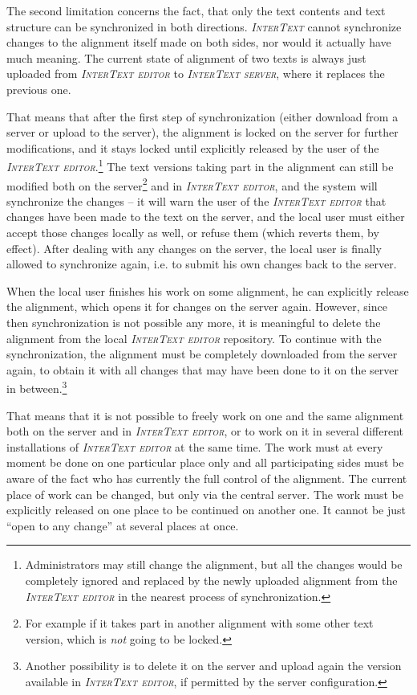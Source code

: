 \documentclass[a4paper,10pt,oneside]{book}
\newcommand{\IT}{\textit{\textsc{InterText}}\xspace}
\newcommand{\ITeditor}{\textit{\textsc{InterText editor}}\xspace}
\newcommand{\ITserver}{\textit{\textsc{InterText server}}\xspace}
\begin{document}
The second limitation concerns the fact, that only the text contents and text structure can be synchronized in both directions. \IT cannot synchronize changes to the alignment itself made on both sides, nor would it actually have much meaning. The current state of alignment of two texts is always just uploaded from \ITeditor to \ITserver, where it replaces the previous one.

That means that after the first step of synchronization (either download from a server or upload to the server), the alignment is locked on the server for further modifications, and it stays locked until explicitly released by the user of the \ITeditor.\footnote{Administrators may still change the alignment, but all the changes would be completely ignored and replaced by the newly uploaded alignment from the \ITeditor in the nearest process of synchronization.} The text versions taking part in the alignment can still be modified both on the server\footnote{For example if it takes part in another alignment with some other text version, which is \emph{not} going to be locked.} and in \ITeditor, and the system will synchronize the changes -- it will warn the user of the \ITeditor that changes have been made to the text on the server, and the local user must either accept those changes locally as well, or refuse them (which reverts them, by effect). After dealing with any changes on the 
server, the local user is finally allowed to synchronize again, i.e. to submit his own changes back to the server.

When the local user finishes his work on some alignment, he can explicitly release the alignment, which opens it for changes on the server again. However, since then synchronization is not possible any more, it is meaningful to delete the alignment from the local \ITeditor repository. To continue with the synchronization, the alignment must be completely downloaded from the server again, to obtain it with all changes that may have been done to it on the server in between.\footnote{Another possibility is to delete it on the server and upload again the version available in \ITeditor, if permitted by the server configuration.}

That means that it is not possible to freely work on one and the same alignment both on the server and in \ITeditor, or to work on it in several different installations of \ITeditor at the same time. The work must at every moment be done on one particular place only and all participating sides must be aware of the fact who has currently the full control of the alignment. The current place of work can be changed, but only via the central server. The work must be explicitly released on one place to be continued on another one. It cannot be just ``open to any change'' at several places at once.
\end{document}
